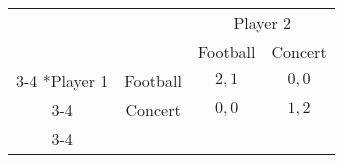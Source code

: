 
\setlength{\extrarowheight}{3pt}

\begin{tabular}{cc|c|c|}
                            & \multicolumn{1}{c}{} & \multicolumn{2}{c}{Player 2}                               \\
                            & \multicolumn{1}{c}{} & \multicolumn{1}{c}{Football} & \multicolumn{1}{c}{Concert} \\ \cline{3-4}
    \multirow{2}*{Player 1} & Football             & $2, 1$                       & $0, 0$                      \\ \cline{3-4}
                            & Concert              & $0, 0$                       & $1, 2$                      \\ \cline{3-4}
\end{tabular}

\setlength{\extrarowheight}{0pt}
